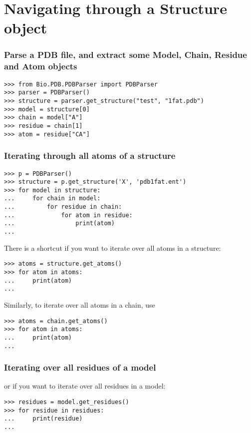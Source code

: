 \section{Navigating through a Structure object}

\subsubsection*{Parse a PDB file, and extract some Model, Chain, Residue and Atom objects}

\begin{verbatim}
>>> from Bio.PDB.PDBParser import PDBParser
>>> parser = PDBParser()
>>> structure = parser.get_structure("test", "1fat.pdb")
>>> model = structure[0]
>>> chain = model["A"]
>>> residue = chain[1]
>>> atom = residue["CA"]
\end{verbatim}

\subsubsection*{Iterating through all atoms of a structure}

\begin{verbatim}
>>> p = PDBParser()
>>> structure = p.get_structure('X', 'pdb1fat.ent')
>>> for model in structure:
...     for chain in model:
...         for residue in chain:
...             for atom in residue:
...                 print(atom)
...
\end{verbatim}

There is a shortcut if you want to iterate over all atoms in a structure:
\begin{verbatim}
>>> atoms = structure.get_atoms()
>>> for atom in atoms:
...     print(atom)
...
\end{verbatim}

Similarly, to iterate over all atoms in a chain, use
\begin{verbatim}
>>> atoms = chain.get_atoms()
>>> for atom in atoms:
...     print(atom)
...
\end{verbatim}

\subsubsection*{Iterating over all residues of a model}

or if you want to iterate over all residues in a model:
\begin{verbatim}
>>> residues = model.get_residues()
>>> for residue in residues:
...     print(residue)
...
\end{verbatim}

